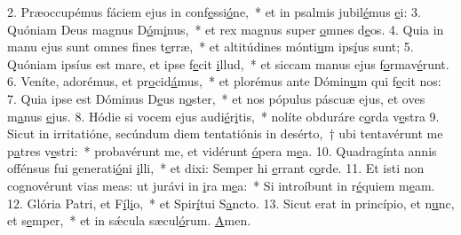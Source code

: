 2. Præoccupémus fáciem ejus in conf\uline{e}ssi\uline{ó}ne,~* et in psalmis jubil\uline{é}mus \uline{e}i:
3. Quóniam Deus magnus D\uline{ó}m\uline{i}nus,~* et rex magnus super \uline{o}mnes d\uline{e}os.
4. Quia in manu ejus sunt omnes f\uline{i}nes t\uline{e}rræ,~* et altitúdines mónti\uline{u}m ips\uline{í}us sunt;
5. Quóniam ipsíus est mare, et ipse f\uline{e}cit \uline{i}llud,~* et siccam manus ejus f\uline{o}rmav\uline{é}runt.
6. Veníte, adorémus, et pr\uline{o}cid\uline{á}mus,~* et plorémus ante Dómin\uline{u}m qui f\uline{e}cit nos:
7. Quia ipse est Dóminus D\uline{e}us n\uline{o}ster,~* et nos pópulus páscuæ ejus, et oves m\uline{a}nus \uline{e}jus.
8. Hódie si vocem ejus audi\uline{é}r\uline{i}tis,~* nolíte obduráre c\uline{o}rda v\uline{e}stra
9. Sicut in irritatióne, secúndum diem tentatiónis in desérto,~† ubi tentavérunt me p\uline{a}tres v\uline{e}stri:~* probavérunt me, et vidérunt \uline{ó}pera m\uline{e}a.
10. Quadragínta annis offénsus fui generati\uline{ó}ni \uline{i}lli,~* et dixi: Semper hi \uline{e}rrant c\uline{o}rde.
11. Et isti non cognovérunt vias meas: ut jurávi in \uline{i}ra m\uline{e}a:~* Si introíbunt in r\uline{é}quiem m\uline{e}am.
12. Glória Patri, et F\uline{í}l\uline{i}o,~* et Spir\uline{í}tui S\uline{a}ncto.
13. Sicut erat in princípio, et n\uline{u}nc, et s\uline{e}mper,~* et in sǽcula sæcul\uline{ó}rum. \uline{A}men.
